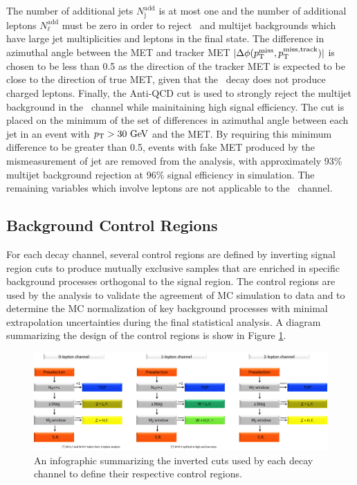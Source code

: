 The number of additional jets $N_{\mathrm{j}}^{\mathrm{add}}$ is at most one and the number of additional leptons $N_{\mathrm{\ell}}^{\mathrm{add}}$ must be zero in order to reject \qrkt\qrktbar\ and multijet backgrounds which have large jet multiplicities and leptons in the final state. The difference in azimuthal angle between the MET and tracker MET $| \Delta\phi(p_{\mathrm{T}}^{\mathrm{miss}}, p_{\mathrm{T}}^{\mathrm{miss, track}}) |$ is chosen to be less than 0.5 as the direction of the tracker MET is expected to be close to the direction of true MET, given that the \bosZ\ decay does not produce charged leptons. Finally, the Anti-QCD cut is used to strongly reject the multijet background in the \ZnnH\ channel while mainitaining high signal efficiency. The cut is placed on the minimum of the set of differences in azimuthal angle between each jet in an event with $p_{\mathrm{T}} > 30\ \mathrm{GeV}$ and the MET. By requiring this minimum difference to be greater than 0.5, events with fake MET produced by the mismeasurement of jet \pT are removed from the analysis, with approximately 93\% multijet background rejection at 96\% signal efficiency in simulation. The remaining variables which involve leptons are not applicable to the \ZnnH\ channel.

\subsection{Background Control Regions} \label{CRs}

For each decay channel, several control regions are defined by inverting signal region cuts to produce mutually exclusive samples that are enriched in specific background processes orthogonal to the signal region. The control regions are used by the analysis to validate the agreement of MC simulation to data and to determine the MC normalization of key background processes with minimal extrapolation uncertainties during the final statistical analysis. A diagram summarizing the design of the control regions is show in Figure \ref{fig:controlregiondef}.

\begin{figure}[htbp]
  \centering
    \includegraphics[width=6in]{images/CR_VH}
    \caption[\VHbb\ Control Region Definitions]{An infographic summarizing the inverted cuts used by each decay channel to define their respective control regions.}
    \label{fig:controlregiondef}
\end{figure}

